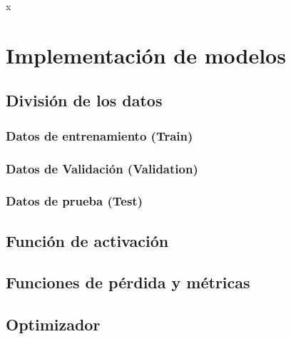 x%
\chapter{Implementación de modelos}\label{ch:ImpModelos}
\section{División de los datos}

\subsection{Datos de entrenamiento (Train)}

\subsection{Datos de Validación (Validation)}

\subsection{Datos de prueba (Test)}


\section{Función de activación}

\section{Funciones de pérdida y métricas}

\section{Optimizador}